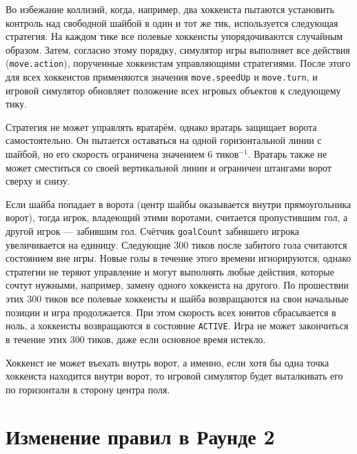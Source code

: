 Во избежание коллизий, когда, например, два хоккеиста пытаются установить контроль над свободной шайбой в один и тот же тик, используется
следующая стратегия. На каждом тике все полевые хоккеисты упорядочиваются случайным образом. Затем, согласно этому порядку, симулятор игры
выполняет все действия (\texttt{move.action}), порученные хоккеистам управляющими стратегиями. После этого для всех хоккеистов применяются
значения \texttt{move.speedUp} и \texttt{move.turn}, и игровой симулятор обновляет положение всех игровых объектов к следующему тику.

Стратегия не может управлять вратарём, однако вратарь защищает ворота самостоятельно. Он пытается оставаться на одной горизонтальной линии
с шайбой, но его скорость ограничена значением $6$ тиков$^{-1}$. Вратарь также не может сместиться со своей вертикальной линии и ограничен
штангами ворот сверху и снизу.

Если шайба попадает в ворота (центр шайбы оказывается внутри прямоугольника ворот), тогда игрок, владеющий этими воротами, считается
пропустившим гол, а другой игрок --- забившим гол. Счётчик \texttt{goalCount} забившего игрока увеличивается на единицу. Следующие $300$
тиков после забитого гола считаются состоянием вне игры. Новые голы в течение этого времени игнорируются, однако стратегии не теряют
управление и могут выполнять любые действия, которые сочтут нужными, например, замену одного хоккеиста на другого. По прошествии этих $300$
тиков все полевые хоккеисты и шайба возвращаются на свои начальные позиции и игра продолжается. При этом скорость всех юнитов сбрасывается
в ноль, а хоккеисты возвращаются в состояние \texttt{ACTIVE}. Игра не может закончиться в течение этих $300$ тиков, даже если основное время
истекло.

Хоккеист не может въехать внутрь ворот, а именно, если хотя бы одна точка хоккеиста находится внутри ворот, то игровой симулятор будет
выталкивать его по горизонтали в сторону центра поля.

\section{Изменение правил в Раунде 2}

